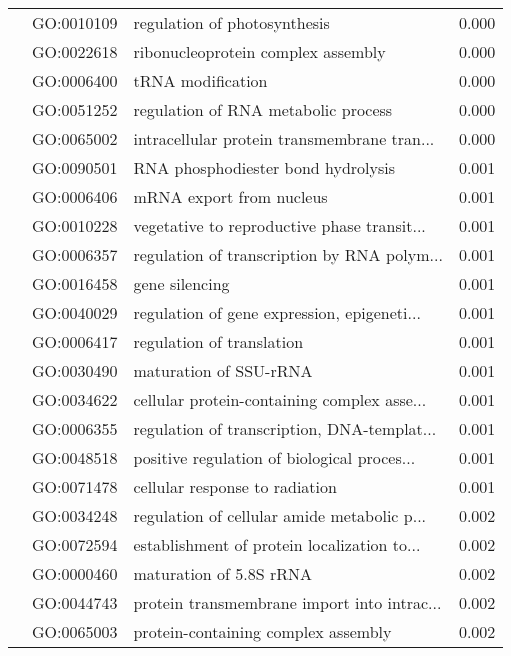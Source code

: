 \begin{longtable}{lllr}
   & GO:0010109 &                 regulation of photosynthesis &         0.000 \\
   & GO:0022618 &           ribonucleoprotein complex assembly &         0.000 \\
   & GO:0006400 &                            tRNA modification &         0.000 \\
   & GO:0051252 &          regulation of RNA metabolic process &         0.000 \\
   & GO:0065002 &  intracellular protein transmembrane tran... &         0.000 \\
   & GO:0090501 &           RNA phosphodiester bond hydrolysis &         0.001 \\
   & GO:0006406 &                     mRNA export from nucleus &         0.001 \\
   & GO:0010228 &  vegetative to reproductive phase transit... &         0.001 \\
   & GO:0006357 &  regulation of transcription by RNA polym... &         0.001 \\
   & GO:0016458 &                               gene silencing &         0.001 \\
   & GO:0040029 &  regulation of gene expression, epigeneti... &         0.001 \\
   & GO:0006417 &                    regulation of translation &         0.001 \\
   & GO:0030490 &                       maturation of SSU-rRNA &         0.001 \\
   & GO:0034622 &  cellular protein-containing complex asse... &         0.001 \\
   & GO:0006355 &  regulation of transcription, DNA-templat... &         0.001 \\
   & GO:0048518 &  positive regulation of biological proces... &         0.001 \\
   & GO:0071478 &               cellular response to radiation &         0.001 \\
   & GO:0034248 &  regulation of cellular amide metabolic p... &         0.002 \\
   & GO:0072594 &  establishment of protein localization to... &         0.002 \\
   & GO:0000460 &                      maturation of 5.8S rRNA &         0.002 \\
   & GO:0044743 &  protein transmembrane import into intrac... &         0.002 \\
   & GO:0065003 &          protein-containing complex assembly &         0.002 \\

\end{longtable}
